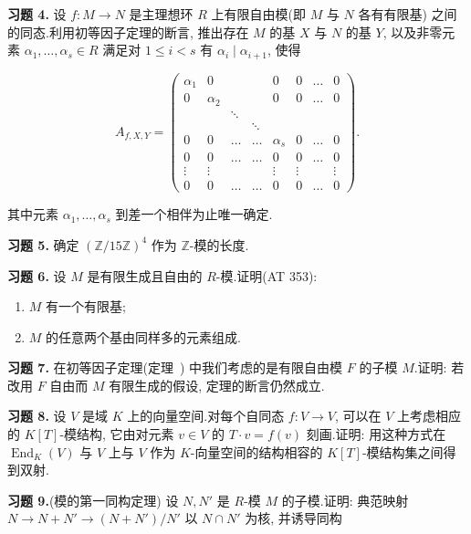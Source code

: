 \medskip
\noindent\textbf{习题 4.} 设 $f \colon M \longrightarrow N$ 是主理想环 $R$ 上有限自由模(即 $M$ 与 $N$ 各有有限基) 之间的同态.利用初等因子定理的断言, 推出存在 $M$ 的基 $X$ 与 $N$ 的基 $Y$, 以及非零元素 $\alpha_1, \ldots, \alpha_s \in R$ 满足对 $1 \leq i < s$ 有 $\alpha_i \mid \alpha_{i + 1}$, 使得

\[
A_{f, X, Y} = \left(\begin{array}{cccccccc}
\alpha_1 & 0 & & & 0 & 0 & \ldots & 0 \\
0 & \alpha_2 & & & 0 & 0 & \ldots & 0 \\
 & & \ddots & & & & & \\
 & & & \ddots & & & & \\
0 & 0 & \ldots & \ldots & \alpha_s & 0 & \ldots & 0 \\
0 & 0 & \ldots & \ldots & 0 & 0 & \ldots & 0 \\
\vdots & \vdots & & & \vdots & \vdots & & \vdots \\
0 & 0 & \ldots & \ldots & 0 & 0 & \ldots & 0
\end{array}\right)\text{.}\]

其中元素 $\alpha_1, \ldots, \alpha_s$ 到差一个相伴为止唯一确定.

\medskip
\noindent\textbf{习题 5.} 确定 $(\mathbb{Z}/15\mathbb{Z})^4$ 作为 $\mathbb{Z}$-模的长度.

\medskip
\noindent\textbf{习题 6.} 设 $M$ 是有限生成且自由的 $R$-模.证明(AT 353):
\begin{enumerate}
\item[(i)] $M$ 有一个有限基;
\item[(ii)] $M$ 的任意两个基由同样多的元素组成.
\end{enumerate}

\medskip
\noindent\textbf{习题 7.} 在初等因子定理(定理~) 中我们考虑的是有限自由模 $F$ 的子模 $M$.证明: 若改用 $F$ 自由而 $M$ 有限生成的假设, 定理的断言仍然成立.

\medskip
\noindent\textbf{习题 8.} 设 $V$ 是域 $K$ 上的向量空间.对每个自同态 $f \colon V \longrightarrow V$, 可以在 $V$ 上考虑相应的 $K[T]$-模结构, 它由对元素 $v \in V$ 的 $T \cdot v = f(v)$ 刻画.证明: 用这种方式在 $\operatorname{End}_K(V)$ 与 $V$ 上与 $V$ 作为 $K$-向量空间的结构相容的 $K[T]$-模结构集之间得到双射.

\medskip
\noindent\textbf{习题 9.}(模的第一同构定理) 设 $N, N'$ 是 $R$-模 $M$ 的子模.证明: 典范映射 $N \longrightarrow N + N' \longrightarrow (N + N')/N'$ 以 $N \cap N'$ 为核, 并诱导同构

